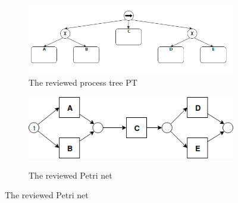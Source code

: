 \begin{figure}
	\centering
	\begin{subfigure}[b]{0.48\textwidth}
		\centering
		\includegraphics[width=\linewidth]{figures/algorithm/PT06_Seq_2_xor_notnested.png}
		\caption{The reviewed process tree PT}
		\label{fig:pt-lt-demo}
	\end{subfigure}%
	\quad
	\begin{subfigure}[b]{0.48\textwidth}
		\centering
		\includegraphics[width=\linewidth]{figures/algorithm/LT_Seq_01_Original.png}
		\label{fig:pn-lt-demo}
		\caption{The reviewed Petri net}
	\end{subfigure}%
\end{figure} 
